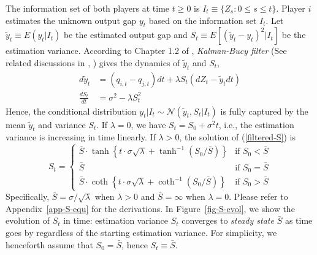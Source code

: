\documentclass[mnsc]{informs3}
\begin{document}
The information set of both players at time $t \ge 0$ is  $I_{t} \equiv \{Z_{s} : 0\le s \le t\}$. 
Player $i$ estimates the unknown output gap $y_t$ based on the information set $I_t$. 
Let $\tilde{y}_t \equiv E(y_{t}|I_t)$ be the estimated output gap and $S_t \equiv E[(\tilde{y}_{t}-y_{t})^2|I_t]$ be the estimation variance. 
According to Chapter 1.2 of \citet{Bensoussan1992Control}, \textit{Kalman-Bucy filter} (See related discussions in \citealt{frogerais2012various}, \citealt{barrau2017invariant}) gives the dynamics of $\tilde{y}_{t}$ and $S_{t}$, 
\begin{align}
	d\tilde{y}_{t} &= (q_{i,t}-q_{j,t})dt + \lambda S_{t}(dZ_{t}-\tilde{y}_{t}dt) 
	\label{filtered-x}\\
	\frac{dS_{t}}{dt} &= \sigma^2 - \lambda S_{t}^2
	\label{filtered-S}
\end{align} 
Hence, the conditional distribution $y_{t}|I_t\sim\mathcal{N}(\tilde{y}_{t},S_{t}|I_t)$ is fully captured by the mean $\tilde{y}_{t}$ and variance $S_{t}$. 
If $\lambda = 0$, we have $S_t = S_0+\sigma^2t$, i.e., the estimation variance is increasing in time linearly. 
If $\lambda > 0$, the solution of (\ref{filtered-S}) is
\begin{equation}\label{S-evolution} 
	S_t = 
	\begin{cases}
        \bar{S} \cdot \tanh\left\{t\cdot\sigma\sqrt{\lambda} +  \tanh^{-1}\left(S_0\big/\bar{S}\right)\right\} & \text{if } S_0 < \bar{S} \\
        \bar{S} & \text{if } S_0 = \bar{S} \\
        \bar{S} \cdot \coth\left\{t\cdot\sigma\sqrt{\lambda} +  \coth^{-1}\left(S_0\big/\bar{S}\right)\right\} & \text{if } S_0 > \bar{S} 
	\end{cases}
\end{equation}
Specifically, $\bar{S} = \sigma / \sqrt{\lambda}$ when $\lambda>0$ and $\bar{S} = \infty$ when $\lambda = 0$. 
Please refer to Appendix~\ref{app-S-equ} for the derivations. 
In Figure~\ref{fig-S-evol}, we show the evolution of $S_t$ in time: estimation variance $S_t$ converges to \textit{steady state} $\bar{S}$ as time goes by regardless of the starting estimation variance. 
For simplicity, we henceforth assume that $S_0 = \bar{S}$, hence $S_t\equiv \bar{S}$. 
\end{document}
